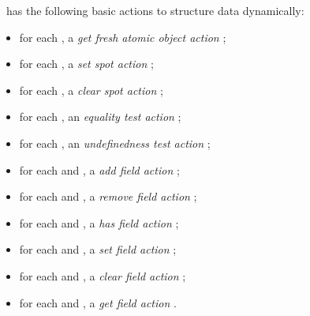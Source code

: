 \documentclass[fleqn]{llncs}
\begin{document}
\DLD\ has the following basic actions to structure data dynamically:
\begin{itemize}
\item
for each ,
a \emph{get fresh atomic object action} ;
\item
for each , a \emph{set spot action} ;
\item
for each , a \emph{clear spot action} ;
\item
for each ,
an \emph{equality test action} ;
\item
for each ,
an \emph{undefinedness test action} ;
\item
for each  and ,
a \emph{add field action} ;
\item
for each  and ,
a \emph{remove field action} ;
\item
for each  and ,
a \emph{has field action} ;
\item
for each  and ,
a \emph{set field action} ;
\item
for each  and ,
a \emph{clear field action} ;
\item
for each  and ,
a \emph{get field action} .
\end{itemize}
\end{document}
